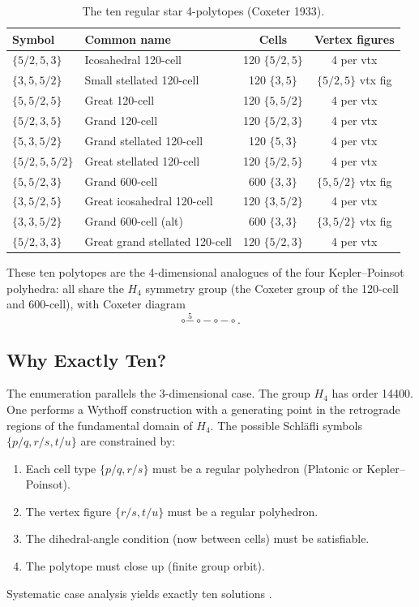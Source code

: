 \begin{table}[h]
\centering
\caption{The ten regular star 4-polytopes (Coxeter 1933).}
\label{tab:star-4-polytopes}
\begin{tabular}{llcc}
\hline
Symbol & Common name & Cells & Vertex figures\\
\hline
$\{5/2,5,3\}$   & Icosahedral 120-cell           & 120 $\{5/2,5\}$ & 4 per vtx\\
$\{3,5,5/2\}$   & Small stellated 120-cell        & 120 $\{3,5\}$   & $\{5/2,5\}$ vtx fig\\
$\{5,5/2,5\}$   & Great 120-cell                  & 120 $\{5,5/2\}$ & 4 per vtx\\
$\{5/2,3,5\}$   & Grand 120-cell                  & 120 $\{5/2,3\}$ & 4 per vtx\\
$\{5,3,5/2\}$   & Grand stellated 120-cell        & 120 $\{5,3\}$   & 4 per vtx\\
$\{5/2,5,5/2\}$ & Great stellated 120-cell        & 120 $\{5/2,5\}$ & 4 per vtx\\
$\{5,5/2,3\}$   & Grand 600-cell                  & 600 $\{3,3\}$   & $\{5,5/2\}$ vtx fig\\
$\{3,5/2,5\}$   & Great icosahedral 120-cell      & 120 $\{3,5/2\}$ & 4 per vtx\\
$\{3,3,5/2\}$   & Grand 600-cell (alt)            & 600 $\{3,3\}$   & $\{3,5/2\}$ vtx fig\\
$\{5/2,3,3\}$   & Great grand stellated 120-cell  & 120 $\{5/2,3\}$ & 4 per vtx\\
\hline
\end{tabular}
\end{table}

These ten polytopes are the 4-dimensional analogues of the
four Kepler–Poinsot polyhedra: all share the $H_4$ symmetry
group (the Coxeter group of the 120-cell and 600-cell), with
Coxeter diagram
\[
  \circ \overset{5}{-} \circ \overset{}{-} \circ \overset{}{-} \circ .
\]

\subsection{Why Exactly Ten?}
\label{ssec:why-ten}

The enumeration parallels the 3-dimensional case.  The group
$H_4$ has order 14400.  One performs a Wythoff construction
with a generating point in the retrograde regions of the
fundamental domain of $H_4$.  The possible Schläfli symbols
$\{p/q, r/s, t/u\}$ are constrained by:
\begin{enumerate}
  \item Each cell type $\{p/q, r/s\}$ must be a regular polyhedron
        (Platonic or Kepler–Poinsot).
  \item The vertex figure $\{r/s, t/u\}$ must be a regular polyhedron.
  \item The dihedral-angle condition (now between cells) must
        be satisfiable.
  \item The polytope must close up (finite group orbit).
\end{enumerate}
Systematic case analysis yields exactly ten solutions
\cite{coxeter_regular_polytopes}.


